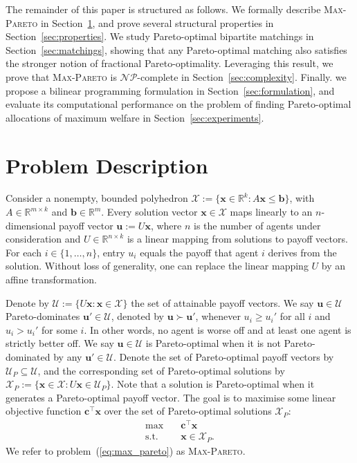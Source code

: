\documentclass[a4paper, 11pt]{article}
\newcommand{\mc}{\mathcal}
\begin{document}
The remainder of this paper is structured as follows. We formally describe \textsc{Max-Pareto} in Section~\ref{sec:problem}, and prove several structural properties in Section~\ref{sec:properties}. We study Pareto-optimal bipartite matchings in Section~\ref{sec:matchings}, showing that any Pareto-optimal matching also satisfies the stronger notion of fractional Pareto-optimality. Leveraging this result, we prove that \textsc{Max-Pareto} is $\mc{NP}$-complete in Section~\ref{sec:complexity}. Finally. we propose a bilinear programming formulation in Section~\ref{sec:formulation}, and evaluate its computational performance on the problem of finding Pareto-optimal allocations of maximum welfare in Section~\ref{sec:experiments}.

\section{Problem Description}
\label{sec:problem} 

Consider a nonempty, bounded polyhedron $\mc{X} := \{ \bm{x} \in \mathbb{R}^k : A \bm{x} \leq \bm{b} \}$, with $A \in \mathbb{R}^{m \times k}$ and $\bm{b} \in \mathbb{R}^m$. Every solution vector $\bm{x} \in \mc{X}$ maps linearly to an $n$-dimensional payoff vector $\bm{u} := U \bm{x}$, where $n$ is the number of agents under consideration and $U \in \mathbb{R}^{n \times k}$ is a linear mapping from solutions to payoff vectors. For each $i \in \{1, \dots, n\}$, entry $u_i$ equals the payoff that agent $i$ derives from the solution. Without loss of generality, one can replace the linear mapping $U$ by an affine transformation.

Denote by $\mc{U} := \{ U \bm{x} : \bm{x} \in \mc{X} \}$ the set of attainable payoff vectors. We say $\bm{u} \in \mc{U}$ Pareto-dominates $\bm{u'} \in \mc{U}$, denoted by $\bm{u} \succ \bm{u}'$, whenever $u_i \geq u_i'$ for all $i$ and $u_i > u_i'$ for some $i$. In other words, no agent is worse off and at least one agent is strictly better off. We say $\bm{u} \in \mc{U}$ is Pareto-optimal when it is not Pareto-dominated by any $\bm{u}' \in \mc{U}$. Denote the set of Pareto-optimal payoff vectors by $\mc{U}_P \subseteq \mc{U}$, and the corresponding set of Pareto-optimal solutions by $\mc{X}_P := \{ \bm{x} \in \mc{X} : U \bm{x} \in \mc{U}_P \}$. Note that a solution is Pareto-optimal when it generates a Pareto-optimal payoff vector. The goal is to maximise some linear objective function $\bm{c}^\top \bm{x}$ over the set of Pareto-optimal solutions $\mc{X}_P$:
\begin{subequations}
\begin{align}
\max \quad & \bm{c}^\top \bm{x} \\
\text{s.t.} \quad & \bm{x} \in \mc{X}_P. 
\end{align}
\label{eq:max_pareto}
\end{subequations}
We refer to problem~(\ref{eq:max_pareto}) as \textsc{Max-Pareto}.
\end{document}
